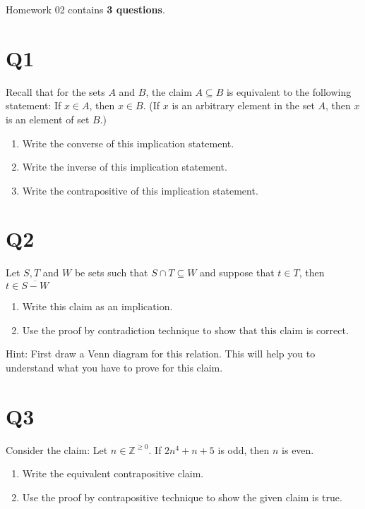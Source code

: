 \documentclass[12pt]{exam}
\begin{document}
Homework 02 contains \textbf{3 questions}.

\section{Q1}
Recall that for the sets $A$ and $B$, the claim $A \subseteq B$ is equivalent to the following statement: If $x \in A$, then $x \in B$. (If $x$ is an arbitrary element in the set $A$, then $x$ is an element of set $B$.)

\begin{enumerate}
    \item Write the converse of this implication statement.
    \item Write the inverse of this implication statement.
    \item Write the contrapositive of this implication statement.
\end{enumerate}

\section{Q2} 
Let $S,T$ and $W$ be sets such that $S \cap T \subseteq W$ and suppose that $t \in T$, then $t \in \overline{S - W}$

\begin{enumerate}
    \item Write this claim as an implication.
    \item Use the proof by contradiction technique to show that this claim is correct.
\end{enumerate}

Hint: First draw a Venn diagram for this relation. This will help you to understand what you have to prove for this claim. 


\section{Q3}
Consider the claim: Let $n \in \mathds{Z}^{\geq 0}$. If $2n^4 + n + 5$ is odd, then $n$ is even.

\begin{enumerate}
    \item Write the equivalent contrapositive claim.
    \item Use the proof by contrapositive technique to show the given claim is true.
\end{enumerate}
\end{document}
